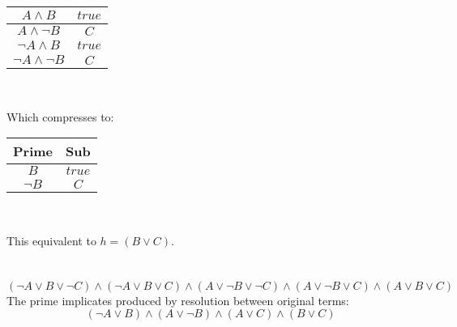 \documentclass{article}
\begin{document}
\begin{enumerate}
\begin{center}
\begin{tabular}{ |c|c| }
             \hline
             $A \land B$ & $true$ \\
             \hline
             $A \land \lnot B$ & $C$ \\
             \hline
             $\lnot A \land B$ & $true$ \\
             \hline
             $\lnot A \land \lnot B$ & $C$ \\
             \hline
            \end{tabular} \\
    \end{center}
    Which compresses to:
    \begin{center}
           \begin{tabular}{ |c|c| }
            \hline
             Prime&Sub \\ 
             \hline
             $B$ & $true$ \\
             \hline
             $\lnot B$ & $C$ \\
             \hline
            \end{tabular} \\
    \end{center}
    This equivalent to $h = (B \lor C)$.
\end{enumerate}
 \clearpage
 \section{}
 \[(\lnot A \lor B \lor \lnot C) \land (\lnot A \lor B \lor C) \land (A \lor \lnot B \lor \lnot C) \land (A \lor \lnot B \lor C) \land (A \lor B \lor C)\]
 The prime implicates produced by resolution between original terms:
 \[
    (\lnot A \lor B) \land (A \lor \lnot B) \land (A \lor C) \land (B \lor C)
\]
 \clearpage
 \section{}

\clearpage
\section{}
\end{document}
